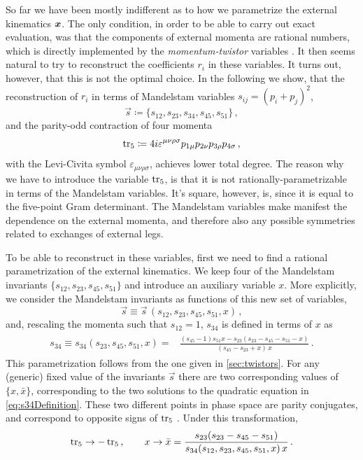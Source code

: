 So far we have been mostly indifferent as to how we parametrize the external kinematics $\vb*{x}$.
The only condition, in order to be able to carry out exact evaluation, was that the components of external momenta
are rational numbers, which is directly implemented by the \emph{momentum-twistor} variables \cite{Hodges:2009hk}.
It then seems natural to try to reconstruct the coefficients $r_i$ in these variables.
It turns out, however, that this is not the optimal choice.
In the following we show, that the reconstruction of $r_i$ in terms of Mandelstam variables $s_{ij}=(p_{i}+p_j)^2$, 
\begin{equation}\label{eq:mandelstams}
\vec s \coloneqq \{s_{12},s_{23},s_{34},s_{45},s_{51}\}\,,
\end{equation}
and the parity-odd contraction of four 
momenta 
\begin{equation}\label{eq:tr5Def}
\operatorname{tr_5} \coloneqq  4 i \varepsilon^{\mu\nu\rho\sigma}
p_{1\mu} p_{2\nu} p_{3\rho} p_{4\sigma}\, ,
\end{equation}
with the Levi-Civita symbol $\varepsilon_{\mu\nu\rho\sigma}$, achieves lower total degree.
The reason why we have to introduce the variable $\operatorname{tr_5}$, is that 
it is not rationally-parametrizable in terms of the Mandelstam variables.
It's square, however, is, since it is equal to the five-point Gram determinant.
The Mandelstam variables 
make manifest the dependence on
the external momenta, and therefore also any possible symmetries related to 
exchanges of external legs.

To be able to reconstruct in these variables, first we need to find a rational 
parametrization of the external kinematics.
We keep four of the Mandelstam invariants
$\{ s_{12}, s_{23}, s_{45}, s_{51} \}$ and introduce an auxiliary variable $x$.
More explicitly, we consider the Mandelstam invariants as functions of
this new set of variables,
\begin{equation}
  \vec s\equiv \vec s\,(s_{12}, s_{23}, s_{45}, s_{51},x)\,,
\end{equation}
and, rescaling the momenta such that $s_{12}=1$, $s_{34}$ is defined in terms of
$x$ as
\begin{align}
\begin{split}
  s_{34}\equiv
    s_{34}(s_{23}, s_{45} , s_{51}, x) =& \frac{ (s_{45} - 1) s_{51} x -
	s_{23} (s_{23} -  s_{45} - s_{51} - x)}{(s_{45} - s_{23} + x)\,x}\,.
    \label{eq:s34Definition}
\end{split}
\end{align}
This parametrization follows from the one given in \cref{sec:twistors}.
For any (generic) fixed value of the invariants $\vec s$
there are two corresponding values of $\{x,\bar x\}$, corresponding to the 
two solutions to the quadratic equation in \eqref{eq:s34Definition}.
These two different points in phase space are parity conjugates, 
and correspond to opposite signs of $\operatorname{tr_5}$ . 
Under this transformation,
\begin{align} 
  \label{eq:parity}
  \operatorname{tr_5}\to-\operatorname{tr_5}\,,\qquad
  x\to\bar x=
  \frac{s_{23}(s_{23}-s_{45}-s_{51})}{s_{34}(s_{12}, s_{23}, s_{45}, s_{51},x)\,x}\,.
\end{align}

